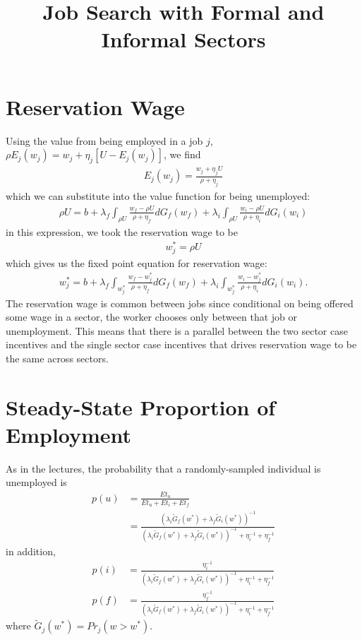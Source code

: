 \documentclass[a4paper,12pt]{article}
\begin{document}
\title{Job Search with Formal and Informal Sectors}

\maketitle

\section{Reservation Wage}

Using the value from being employed in a job $j$, $\rho E_j(w_j) = w_j + \eta_j [U-E_j(w_j)]$, we find
\begin{align*}
    E_j(w_j) = \frac{w_j+\eta_j U}{\rho+\eta_j}
\end{align*}
which we can substitute into the value function for being unemployed:
\begin{align*}
    \rho U = b + \lambda_f \int_{\rho U} \frac{w_f-\rho U}{\rho+\eta_f} dG_f(w_f) + \lambda_i \int_{\rho U} \frac{w_i-\rho U}{\rho+\eta_i} dG_i(w_i)
\end{align*}
in this expression, we took the reservation wage to be
\begin{align*}
    w_j^* = \rho U
\end{align*}
which gives us the fixed point equation for reservation wage:
\begin{align*}
    w_j^* = b + \lambda_f \int_{w_j^*} \frac{w_f- w_j^*}{\rho+\eta_f} dG_f(w_f) + \lambda_i \int_{w_j^*} \frac{w_i-w_j^*}{\rho+\eta_i} dG_i(w_i).
\end{align*}
The reservation wage is common between jobs since conditional on being offered some wage in a sector, the worker chooses only between that job or unemployment. This means that there is a parallel between the two sector case incentives and the single sector case incentives that drives reservation wage to be the same across sectors.

\section{Steady-State Proportion of Employment}

As in the lectures, the probability that a randomly-sampled individual is unemployed is 
\begin{align*}
    p(u) &= \frac{Et_u}{Et_u+Et_i+Et_f} \\
         &= \frac{(\lambda_i \tilde{G}_f (w^{*})+\lambda_f \tilde{G}_i (w^{*}))^{-1}}{(\lambda_i \tilde{G}_f (w^{*})+\lambda_f \tilde{G}_i (w^{*}))^{-1}+\eta_i^{-1}+\eta_f^{-1}}
\end{align*}
in addition,
\begin{align*}
    p(i) &= \frac{\eta_i^{-1}}{(\lambda_i \tilde{G}_f (w^{*})+\lambda_f \tilde{G}_i (w^{*}))^{-1}+\eta_i^{-1}+\eta_f^{-1}}\\
    p(f) & = \frac{\eta_f^{-1}}{(\lambda_i \tilde{G}_f (w^{*})+\lambda_f \tilde{G}_i (w^{*}))^{-1}+\eta_i^{-1}+\eta_f^{-1}}
\end{align*}
where $\tilde{G}_j (w^{*}) = Pr_j(w>w^*)$.
\end{document}
